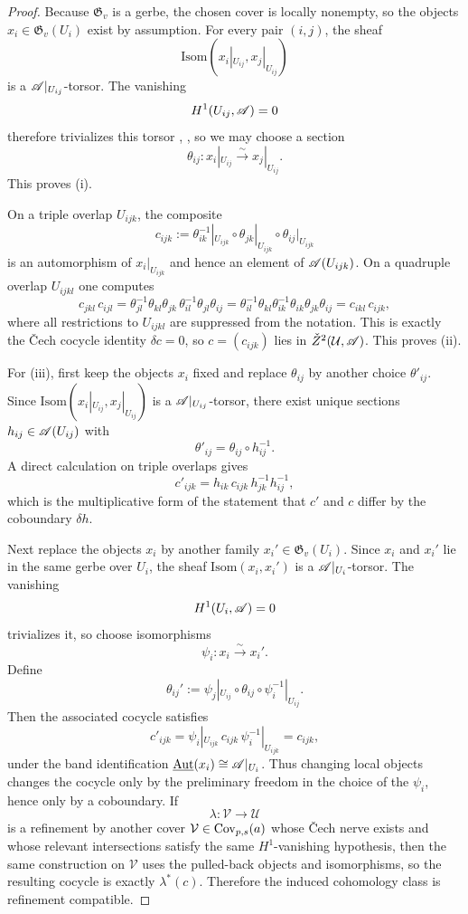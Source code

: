 \begin{proof}
Because $\mathfrak G_v$ is a gerbe, the chosen cover is locally nonempty, so the objects $x_i\in \mathfrak G_v(U_i)$ exist by assumption. For every pair $(i,j)$, the sheaf
\[
\mathrm{Isom}(x_i|_{U_{ij}},x_j|_{U_{ij}})
\]
is a $\mathscr{A}|_{U_{ij}}$-torsor. The vanishing
\[
H^1(U_{ij},\mathscr{A})=0
\]
therefore trivializes this torsor \cite[Chap.~III]{MacLaneMoerdijk1994}, \cite[Sec.~11]{StacksProject}, so we may choose a section
\[
\theta_{ij}:x_i|_{U_{ij}}\xrightarrow{\sim} x_j|_{U_{ij}}.
\]
This proves \textup{(i)}.

On a triple overlap $U_{ijk}$, the composite
\[
c_{ijk}:=\theta_{ik}^{-1}|_{U_{ijk}}\circ \theta_{jk}|_{U_{ijk}}\circ \theta_{ij}|_{U_{ijk}}
\]
is an automorphism of $x_i|_{U_{ijk}}$ and hence an element of $\mathscr{A}(U_{ijk})$. On a quadruple overlap $U_{ijkl}$ one computes
\[
c_{jkl}\,c_{ijl}
=
\theta_{jl}^{-1}\theta_{kl}\theta_{jk}\,\theta_{il}^{-1}\theta_{jl}\theta_{ij}
=
\theta_{il}^{-1}\theta_{kl}\theta_{ik}^{-1}\theta_{ik}\theta_{jk}\theta_{ij}
=
c_{ikl}\,c_{ijk},
\]
where all restrictions to $U_{ijkl}$ are suppressed from the notation. This is exactly the \v{C}ech cocycle identity $\delta c=0$, so $c=(c_{ijk})$ lies in $\check Z^2(\mathcal U,\mathscr{A})$. This proves \textup{(ii)}.

For \textup{(iii)}, first keep the objects $x_i$ fixed and replace $\theta_{ij}$ by another choice $\theta'_{ij}$. Since $\mathrm{Isom}(x_i|_{U_{ij}},x_j|_{U_{ij}})$ is a $\mathscr{A}|_{U_{ij}}$-torsor, there exist unique sections $h_{ij}\in \mathscr{A}(U_{ij})$ with
\[
\theta'_{ij}=\theta_{ij}\circ h_{ij}^{-1}.
\]
A direct calculation on triple overlaps gives
\[
c'_{ijk}=h_{ik}\,c_{ijk}\,h_{jk}^{-1}h_{ij}^{-1},
\]
which is the multiplicative form of the statement that $c'$ and $c$ differ by the coboundary $\delta h$.

Next replace the objects $x_i$ by another family $x_i'\in \mathfrak G_v(U_i)$. Since $x_i$ and $x_i'$ lie in the same gerbe over $U_i$, the sheaf $\mathrm{Isom}(x_i,x_i')$ is a $\mathscr{A}|_{U_i}$-torsor. The vanishing
\[
H^1(U_i,\mathscr{A})=0
\]
trivializes it, so choose isomorphisms
\[
\psi_i:x_i\xrightarrow{\sim} x_i'.
\]
Define
\[
\theta_{ij}':=\psi_j|_{U_{ij}}\circ \theta_{ij}\circ \psi_i^{-1}|_{U_{ij}}.
\]
Then the associated cocycle satisfies
\[
c'_{ijk}
=
\psi_i|_{U_{ijk}}\,c_{ijk}\,\psi_i^{-1}|_{U_{ijk}}
=
c_{ijk},
\]
under the band identification $\underline{\mathrm{Aut}}(x_i)\cong \mathscr{A}|_{U_i}$. Thus changing local objects changes the cocycle only by the preliminary freedom in the choice of the $\psi_i$, hence only by a coboundary. If
\[
\lambda:\mathcal V\to\mathcal U
\]
is a refinement by another cover $\mathcal V\in\mathrm{Cov}_{p,s}(a)$ whose \v{C}ech nerve exists and whose relevant intersections satisfy the same $H^1$-vanishing hypothesis, then the same construction on $\mathcal V$ uses the pulled-back objects and isomorphisms, so the resulting cocycle is exactly $\lambda^*(c)$. Therefore the induced cohomology class is refinement compatible.


\end{proof}
